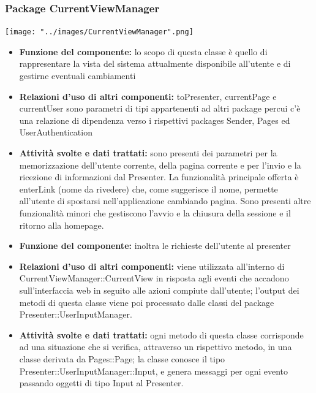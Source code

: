 \rigaregistro{0.0.17}{Luca Alessio (Progettista)}{12/05/2016}{Termine stesura sezione diagrammi e revisione/ampliamento di vari paragrafi}\documentclass[a4paper,11pt]{article}
\begin{document}
		     \subsubsection{Package CurrentViewManager}
			\begin{center}
				\texttt{[image: "../images/CurrentViewManager".png]}
			\end{center}		    
		    	\begin{itemize}
		    \item\textbf{Funzione del componente:} lo scopo di questa classe è quello di rappresentare la vista del sistema attualmente disponibile all'utente e di gestirne eventuali cambiamenti 
		    \item\textbf{Relazioni d'uso di altri componenti:} toPresenter, currentPage e currentUser sono parametri di tipi appartenenti ad altri package percui c'è una relazione di dipendenza verso i rispettivi packages Sender, Pages ed UserAuthentication
			\item\textbf{Attività svolte e dati trattati:} sono presenti dei parametri per la memorizzazione dell'utente corrente, della pagina corrente e per l'invio e la ricezione di informazioni dal Presenter. La funzionalità principale offerta è enterLink (nome da rivedere) che, come suggerisce il nome, permette all'utente di spostarsi nell'applicazione cambiando pagina. Sono presenti altre funzionalità minori che gestiscono l'avvio e la chiusura della sessione e il ritorno alla homepage.
			\end{itemize}
			\begin{itemize}
			\item\textbf{Funzione del componente:} inoltra le richieste dell'utente al presenter
			\item\textbf{Relazioni d'uso di altri componenti:}  viene utilizzata all'interno di CurrentViewManager::CurrentView in risposta agli eventi che accadono sull'interfaccia web in seguito alle azioni compiute dall'utente; l'output dei metodi di questa classe viene poi processato dalle classi del package Presenter::UserInputManager.
			\item\textbf{Attività svolte e dati trattati:} ogni metodo di questa classe corrisponde ad una situazione che si verifica, attraverso un rispettivo metodo, in una classe derivata da Pages::Page; la classe conosce il tipo Presenter::UserInputManager::Input, e genera messaggi per ogni evento passando oggetti di tipo Input al Presenter.
			\end{itemize}
			
\end{document}
